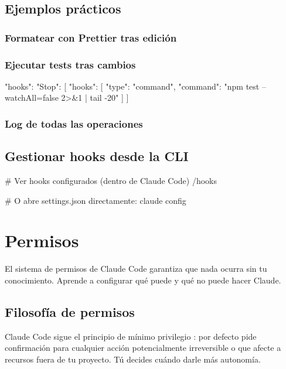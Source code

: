 \documentclass[11pt,a4paper]{book}
\begin{document}
\section{Ejemplos prácticos}
\subsection{Formatear con Prettier tras edición}
\subsection{Ejecutar tests tras cambios}
\begin{codebox}
{
  "hooks": {
    "Stop": [{
      "hooks": [{
        "type": "command",
        "command": "npm test --watchAll=false 2>&1 | tail -20"
      }]
    }]
  }
}
\end{codebox}
\subsection{Log de todas las operaciones}
\section{Gestionar hooks desde la CLI}
\begin{codebox}
# Ver hooks configurados (dentro de Claude Code)
/hooks

# O abre settings.json directamente:
claude config
\end{codebox}
\chapter{Permisos}
El sistema de permisos de Claude Code garantiza que nada ocurra sin tu conocimiento. Aprende a configurar qué puede y qué no puede hacer Claude.

\section{Filosofía de permisos}
Claude Code sigue el principio de mínimo privilegio : por defecto pide confirmación para cualquier acción potencialmente irreversible o que afecte a recursos fuera de tu proyecto. Tú decides cuándo darle más autonomía.
\end{document}
